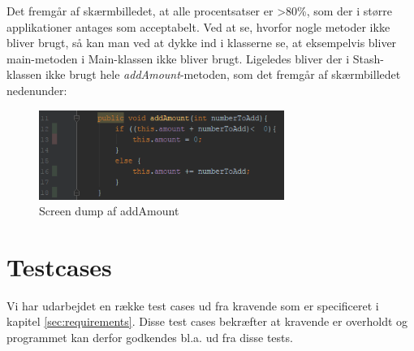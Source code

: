 Det fremgår af skærmbilledet, at alle procentsatser er >80\%, som der i større applikationer antages som acceptabelt. Ved at se, hvorfor nogle metoder ikke bliver brugt, så kan man ved at dykke ind i klasserne se, at eksempelvis bliver main-metoden i Main-klassen ikke bliver brugt. Ligeledes bliver der i Stash-klassen ikke brugt hele \textit{addAmount}-metoden, som det fremgår af skærmbilledet nedenunder:
\begin{figure}
    \begin{center}
        \includegraphics[width=8cm]{graphics/coveragetest/coveragetest2.png}
        \caption{Screen dump af addAmount}
        \label{fig:codecoverage_addamount}
    \end{center}
\end{figure}

\section{Testcases}

Vi har udarbejdet en række test cases ud fra kravende som er specificeret i kapitel \ref{sec:requirements}.
Disse test cases bekræfter at kravende er overholdt og programmet kan derfor godkendes bl.a. ud fra disse tests.


